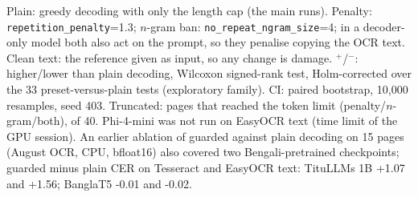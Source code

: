 \begin{table}[t]
\begin{minipage}{\linewidth}\footnotesize Plain: greedy decoding with only the length cap (the main runs). Penalty: \texttt{repetition\_penalty}=1.3; $n$-gram ban: \texttt{no\_repeat\_ngram\_size}=4; in a decoder-only model both also act on the prompt, so they penalise copying the OCR text. Clean text: the reference given as input, so any change is damage. $^{+}$/$^{-}$: higher/lower than plain decoding, Wilcoxon signed-rank test, Holm-corrected over the 33 preset-versus-plain tests (exploratory family). CI: paired bootstrap, 10{,}000 resamples, seed 403. Truncated: pages that reached the token limit (penalty/$n$-gram/both), of 40. Phi-4-mini was not run on EasyOCR text (time limit of the GPU session). An earlier ablation of guarded against plain decoding on 15 pages (August OCR, CPU, bfloat16) also covered two Bengali-pretrained checkpoints; guarded minus plain CER on Tesseract and EasyOCR text: TituLLMs 1B +1.07 and +1.56; BanglaT5 -0.01 and -0.02.\end{minipage}
\end{table}
